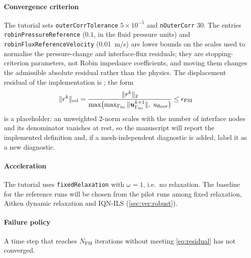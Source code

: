 \paragraph{Convergence criterion} The tutorial sets
\texttt{outerCorrTolerance} $5\times10^{-5}$ and \texttt{nOuterCorr} 30. The
entries \texttt{robinPressureReference} ($0.1$, in the fluid pressure
units) and \texttt{robinFluxReferenceVelocity} (\SI{0.01}{m/s}) are lower
bounds on the scales used to normalise the pressure-change and
interface-flux residuals; they are stopping-criterion parameters, not Robin
impedance coefficients, and moving them changes the admissible absolute
residual rather than the physics. The displacement residual of the
implementation is ; the form
\begin{equation}
\|r^{k}\|_{\mathrm{rel}} =
\frac{\|r^{k}\|_{2}}{\max\bigl(\max_{\Gamma_{\mathrm{fsi}}}\|\bm{u}^{k+1}_{\Gamma_{\mathrm{fsi}}}\|,\;u_{\mathrm{floor}}\bigr)}
\le \epsilon_{\mathrm{FSI}}
\label{eq:residual}
\end{equation}
is a placeholder: an unweighted 2-norm scales with the number of interface
nodes and its denominator vanishes at rest, so the manuscript will report
the implemented definition and, if a mesh-independent diagnostic is added,
label it as a new diagnostic.

\paragraph{Acceleration} The tutorial uses \texttt{fixedRelaxation} with
$\omega=1$, i.e.\ no relaxation. The baseline for the reference runs will be
chosen from the pilot runs among fixed relaxation, Aitken dynamic
relaxation \citep{Kuttler2008} and IQN-ILS \citep{Degroote2009}
(\cref{sec:ver:robust}). 

\paragraph{Failure policy}\label{sec:methods:failure}
A time step that reaches $N_{\mathrm{FSI}}$ iterations without meeting
\cref{eq:residual} has not converged. 

